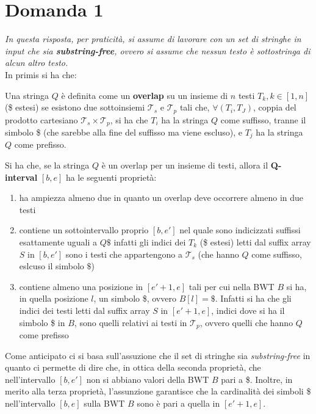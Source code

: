 \documentclass[a4paper,12pt, oneside]{book}
\begin{document}
\section{Domanda 1}
\textit{In questa risposta, per praticità, si assume di lavorare con un set di
  stringhe in input che sia \textbf{substring-free}, ovvero si assume che nessun
  testo è sottostringa di alcun altro testo.}  \\
In primis si ha che:
\begin{definizione}
  Una stringa $Q$ è definita come un \textbf{overlap} su un insieme di $n$ testi
  $T_k, k\in[1,n]$ (\$ estesi) se esistono due sottoinsiemi $\mathcal{T}_s$ e
  $\mathcal{T}_p$ tali che, $\forall (T_i, T_J)$, coppia del prodotto cartesiano
  $\mathcal{T}_s\times \mathcal{T}_p$, si ha che $T_i$ ha la stringa $Q$ come
  suffisso, tranne il simbolo \$ (che sarebbe alla fine del suffisso ma viene
  escluso), e $T_j$ ha la stringa $Q$ come prefisso. 
\end{definizione}
\noindent
Si ha che, se la stringa $Q$ è un overlap per un insieme di testi, allora il
\textbf{Q-interval} $[b,e]$ ha le seguenti proprietà:
\begin{enumerate}
  \item ha ampiezza almeno due in quanto un overlap deve occorrere almeno in due
  testi
  \item contiene un sottointervallo proprio $[b, e']$ nel quale sono indicizzati
  suffissi esattamente uguali a $Q\$$ infatti gli indici dei $T_k$ (\$ estesi)
  letti dal
  suffix array $S$ in $[b, e']$ sono i testi che appartengono a $\mathcal{T}_s$
  (che hanno $Q$ come suffisso, eslcuso il simbolo $\$$)
  \item contiene almeno una posizione in $[e'+1,e]$ tali per cui nella BWT $B$
  si ha, in quella posizione $l$, un simbolo \$, ovvero $B[l]=\$$. Infatti si ha
  che gli indici dei testi letti dal suffix array $S$ in $[e'+1,e]$, indici dove
  si ha il simbolo \$ in $B$, sono quelli relativi ai testi in $\mathcal{T}_p$,
  ovvero quelli che hanno $Q$ come prefisso
\end{enumerate}
Come anticipato ci si basa sull'assuzione che il set di stringhe sia
\textit{substring-free} in quanto ci permette di dire che, in ottica della
seconda proprietà, che nell'intervallo $[b, e']$ non si abbiano valori della BWT
$B$ pari a \$. Inoltre, in merito alla terza proprietà, l'assunzione garantisce
che la cardinalità dei simboli \$ nell'intervallo $[b,e]$ sulla BWT $B$ sono è
pari a quella in $[e'+1,e]$.
\end{document}
